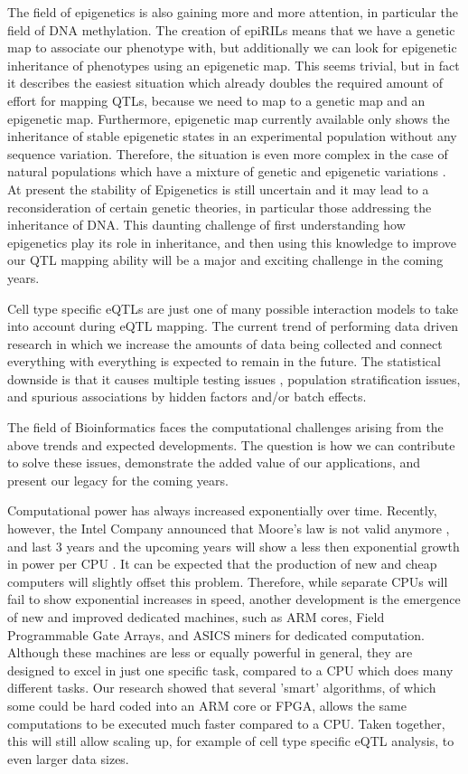 The field of epigenetics is also gaining more and more attention, in particular the field of DNA methylation. The creation of epiRILs \cite{Johannes:2011} means 
that we have a genetic map to associate our phenotype with, but additionally we can look for epigenetic inheritance of phenotypes using an 
epigenetic map. This seems trivial, but in fact it describes the easiest situation which already doubles the required amount of effort for 
mapping QTLs, because we need to map to a genetic map and an epigenetic map. Furthermore, epigenetic map currently available only shows the 
inheritance of stable epigenetic states in an experimental population without any sequence variation. Therefore, the situation is even more 
complex in the case of natural populations which have a mixture of genetic and epigenetic variations \cite{Johannes:2014}. At present the 
stability of Epigenetics is still uncertain and it may lead to a reconsideration of certain genetic theories, in particular those addressing 
the inheritance of DNA. This daunting challenge of first understanding how epigenetics play its role in inheritance, and then using this 
knowledge to improve our QTL mapping ability will be a major and exciting challenge in the coming years.

Cell type specific eQTLs are just one of many possible interaction models to take into account during eQTL mapping. The current trend of 
performing data driven research in which we increase the amounts of data being collected and connect everything with everything is expected 
to remain in the future. The statistical downside is that it causes multiple testing issues \cite{Benjamini:2010}, population stratification issues, and 
spurious associations by hidden factors \cite{Huff:1993} and/or batch effects. 

The field of Bioinformatics faces the computational challenges arising from the above trends and expected developments. The question is how we 
can contribute to solve these issues, demonstrate the added value of our applications, and present our legacy for the coming years.

Computational power has always increased exponentially over time. Recently, however, the Intel Company announced that Moore's law is not valid 
anymore \cite{Editorial:2009, Shah:2013}, and last 3 years and the upcoming years will show a less then exponential growth in power per CPU \cite{Shah:2013}. It can be expected 
that the production of new and cheap computers will slightly offset this problem. Therefore, while separate CPUs will fail to show exponential 
increases in speed, another development is the emergence of new and improved dedicated machines, such as ARM cores, Field Programmable Gate 
Arrays, and ASICS miners for dedicated computation. Although these machines are less or equally powerful in general, they are designed to excel 
in just one specific task, compared to a CPU which does many different tasks. Our research showed that several 'smart' algorithms, of which some 
could be hard coded into an ARM core or FPGA, allows the same computations to be executed much faster compared to a CPU. Taken together, this 
will still allow scaling up, for example of cell type specific eQTL analysis, to even larger data sizes.

